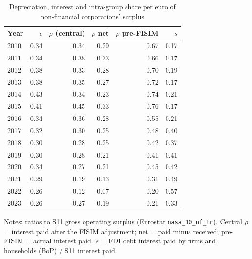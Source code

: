 \begin{table}[!htbp]
\centering
\small
\caption{Depreciation, interest and intra-group share per euro of non-financial corporations' surplus}
\label{tab:rho}
\begin{tabular}{lrrrrr}
\toprule
Year & $c$ & $\rho$ (central) & $\rho$ net & $\rho$ pre-FISIM & $s$ \\
\midrule
2010 & 0.34 & 0.34 & 0.29 & 0.67 & 0.17 \\
2011 & 0.34 & 0.38 & 0.33 & 0.66 & 0.17 \\
2012 & 0.38 & 0.33 & 0.28 & 0.70 & 0.19 \\
2013 & 0.38 & 0.35 & 0.27 & 0.72 & 0.17 \\
2014 & 0.43 & 0.34 & 0.23 & 0.74 & 0.21 \\
2015 & 0.41 & 0.45 & 0.33 & 0.76 & 0.17 \\
2016 & 0.34 & 0.36 & 0.28 & 0.55 & 0.21 \\
2017 & 0.32 & 0.30 & 0.25 & 0.48 & 0.40 \\
2018 & 0.30 & 0.28 & 0.25 & 0.42 & 0.37 \\
2019 & 0.30 & 0.28 & 0.21 & 0.41 & 0.41 \\
2020 & 0.34 & 0.27 & 0.21 & 0.45 & 0.42 \\
2021 & 0.29 & 0.19 & 0.13 & 0.31 & 0.49 \\
2022 & 0.26 & 0.12 & 0.07 & 0.20 & 0.57 \\
2023 & 0.26 & 0.27 & 0.19 & 0.21 & 0.33 \\
\bottomrule
\end{tabular}

\smallskip
\begin{minipage}{0.9\textwidth}\footnotesize Notes: ratios to S11 gross operating surplus (Eurostat \texttt{nasa\_10\_nf\_tr}). Central $\rho$ = interest paid after the FISIM adjustment; net = paid minus received; pre-FISIM = actual interest paid. $s$ = FDI debt interest paid by firms and households (BoP) / S11 interest paid.\end{minipage}
\end{table}
